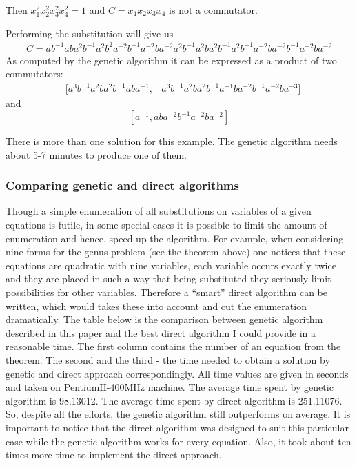 \documentclass{article}
\begin{document}
\noindent
Then $x_1^2 x_2^2 x_3^2 x_4^2 = 1$ 
and $C = x_1 x_2 x_3 x_4$ is not a commutator.

\noindent
Performing the substitution will give us 
\begin{eqnarray*}
C = a b^{-1} a b a^2 b^{-1} a^2 b^2 a^{-2} b^{-1} a^{-2} b a^{-2}  a^2 b^{-1}
 a^2 b a^2 b^{-1} a^2 b^{-1} a^{-2} b a^{-2} b^{-1} a^{-2} b a^{-2}
\end{eqnarray*}
As computed by the genetic algorithm it can be expressed as a product
of two commutators:
\begin{eqnarray*}
& [a^3 b^{-1} a^2 b a^2 b^{-1} a b a^{-1}, 
& a^3 b^{-1} a^2 b a^2 b^{-1} a^{-1} b a^{-2} b^{-1} a^{-2} b a^{-3}] 
\end{eqnarray*}
and
\[
[a^{-1}, a b a^{-2} b^{-1} a^{-2} b a^{-2}]
\]

There is more than one solution for this example. The genetic
algorithm needs about 5-7 minutes to produce one of them.


\subsubsection{Comparing genetic and direct algorithms}

Though a simple enumeration of all substitutions on variables of a
given equations is futile, in some special cases it is possible to
limit the amount of enumeration and hence, speed up the algorithm. For
example, when considering nine forms for the genus problem (see the
theorem above) one notices that these equations are quadratic with
nine variables, each variable occurs exactly twice and they are placed
in such a way that being substituted they seriously limit
possibilities for other variables. Therefore a ``smart'' direct
algorithm can be written, which would takes these into account and cut
the enumeration dramatically. The table below is the comparison
between genetic algorithm described in this paper and the best direct
algorithm I could provide in a reasonable time. The first column
contains the number of an equation from the theorem. The second and
the third - the time needed to obtain a solution by genetic and direct
approach correspondingly. All time values are given in seconds and
taken on PentiumII-400MHz machine. The average time spent by genetic
algorithm is 98.13012. The average time spent by direct algorithm is
251.11076. So, despite all the efforts, the genetic algorithm still
outperforms on average. It is important to notice that the direct
algorithm was designed to suit this particular case while the genetic
algorithm works for every equation. Also, it took about ten times more
time to implement the direct approach.
\end{document}

